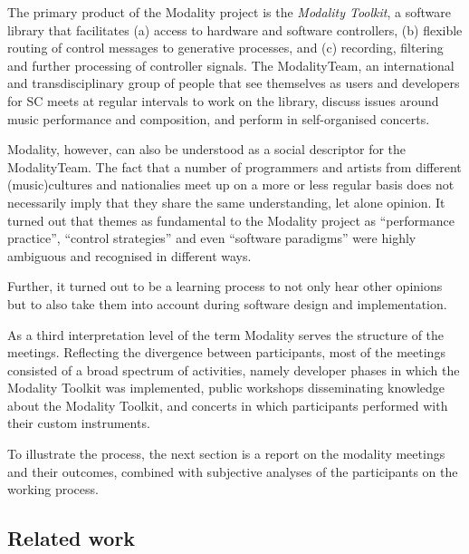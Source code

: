 \documentclass{article}
\newcommand{\todo}[1] {\emph{\textbf{TODO:} #1}}
\begin{document}
The primary product of the Modality project is the \emph{Modality Toolkit}, a software library that facilitates (a) access to hardware and software controllers, (b) flexible routing of control messages to generative processes, and (c) recording, filtering and further processing of controller signals.
The ModalityTeam, an international and transdisciplinary group of people that see themselves as users and developers for SC meets at regular intervals to work on the library, discuss issues around music performance and composition, and perform in self-organised concerts.

Modality, however, can also be understood as a social descriptor for the ModalityTeam.
The fact that a number of programmers and artists from different (music)cultures and nationalies meet up on a more or less regular basis does not necessarily imply that they share the same  understanding, let alone opinion.
It turned out that themes as fundamental to the Modality project as ``performance practice'', ``control strategies'' and even ``software paradigms'' were highly ambiguous and recognised in different ways.

Further, it turned out to be a learning process to not only hear other opinions but to also take them into account during software design and implementation.

As a third interpretation level of the term Modality serves the structure of the meetings.
Reflecting the divergence between participants, most of the meetings consisted of a broad spectrum of activities, namely developer phases in which the Modality Toolkit was implemented, public workshops disseminating knowledge about the Modality Toolkit, and concerts in which participants performed with their custom instruments.

To illustrate the process, the next section is a report on the modality meetings and their outcomes, combined with subjective analyses of the participants on the working process.



\subsection{Related work}
\label{sec:related_work}

\end{document}
